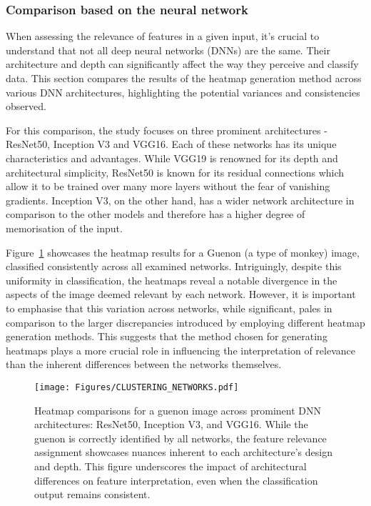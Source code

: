 \subsubsection{Comparison based on the neural network}

When assessing the relevance of features in a given input, it's crucial to understand that not all deep neural networks (DNNs) are the same. Their architecture and depth can significantly affect the way they perceive and classify data. This section compares the results of the heatmap generation method across various DNN architectures, highlighting the potential variances and consistencies observed.

For this comparison, the study focuses on three prominent architectures - ResNet50, Inception V3 and VGG16. Each of these networks has its unique characteristics and advantages. While VGG19 is renowned for its depth and architectural simplicity, ResNet50 is known for its residual connections which allow it to be trained over many more layers without the fear of vanishing gradients. Inception V3, on the other hand, has a wider network architecture in comparison to the other models and therefore has a higher degree of memorisation of the input.

Figure~\ref{Fig:CLUSTERING_NETWORKS} showcases the heatmap results for a Guenon (a type of monkey) image, classified consistently across all examined networks. Intriguingly, despite this uniformity in classification, the heatmaps reveal a notable divergence in the aspects of the image deemed relevant by each network. However, it is important to emphasise that this variation across networks, while significant, pales in comparison to the larger discrepancies introduced by employing different heatmap generation methods. This suggests that the method chosen for generating heatmaps plays a more crucial role in influencing the interpretation of relevance than the inherent differences between the networks themselves.


\begin{figure}[ht!]
	\begin{center}
\texttt{[image: Figures/CLUSTERING\_NETWORKS.pdf]}
\end{center}
\caption{Heatmap comparisons for a guenon image across prominent DNN architectures: ResNet50, Inception V3, and VGG16. While the guenon is correctly identified by all networks, the feature relevance assignment showcases nuances inherent to each architecture's design and depth. This figure underscores the impact of architectural differences on feature interpretation, even when the classification output remains consistent.}
\label{Fig:CLUSTERING_NETWORKS}
\end{figure} 




